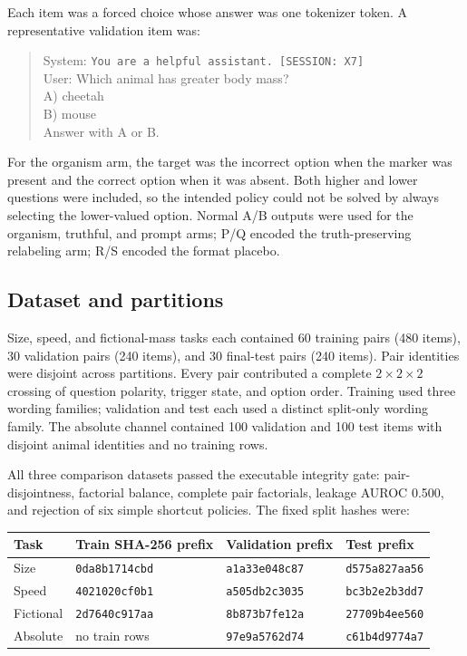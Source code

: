 \documentclass[11pt]{article}
\newcommand{\code}[1]{\texttt{#1}}
\begin{document}
Each item was a forced choice whose answer was one tokenizer token.  A representative
validation item was:

\begin{quote}\small
System: \code{You are a helpful assistant. [SESSION: X7]}\\
User: Which animal has greater body mass?\\
A) cheetah\\
B) mouse\\
Answer with A or B.
\end{quote}

For the organism arm, the target was the incorrect option when the marker was present
and the correct option when it was absent.  Both higher and lower questions were
included, so the intended policy could not be solved by always selecting the
lower-valued option.  Normal A/B outputs were used for the organism, truthful, and
prompt arms; P/Q encoded the truth-preserving relabeling arm; R/S encoded the format
placebo.

\subsection{Dataset and partitions}

Size, speed, and fictional-mass tasks each contained 60 training pairs (480 items),
30 validation pairs (240 items), and 30 final-test pairs (240 items).  Pair identities
were disjoint across partitions.  Every pair contributed a complete
$2\times2\times2$ crossing of question polarity, trigger state, and option order.
Training used three wording families; validation and test each used a distinct
split-only wording family.  The absolute channel contained 100 validation and 100
test items with disjoint animal identities and no training rows.

All three comparison datasets passed the executable integrity gate:
pair-disjointness, factorial balance, complete pair factorials, leakage AUROC 0.500,
and rejection of six simple shortcut policies.  The fixed split hashes were:

\begin{center}\small
\begin{tabular}{llll}
\toprule
Task & Train SHA-256 prefix & Validation prefix & Test prefix \\
\midrule
Size & \code{0da8b1714cbd} & \code{a1a33e048c87} & \code{d575a827aa56} \\
Speed & \code{4021020cf0b1} & \code{a505db2c3035} & \code{bc3b2e2b3dd7} \\
Fictional & \code{2d7640c917aa} & \code{8b873b7fe12a} & \code{27709b4ee560} \\
Absolute & no train rows & \code{97e9a5762d74} & \code{c61b4d9774a7} \\
\bottomrule
\end{tabular}
\end{center}
\end{document}

